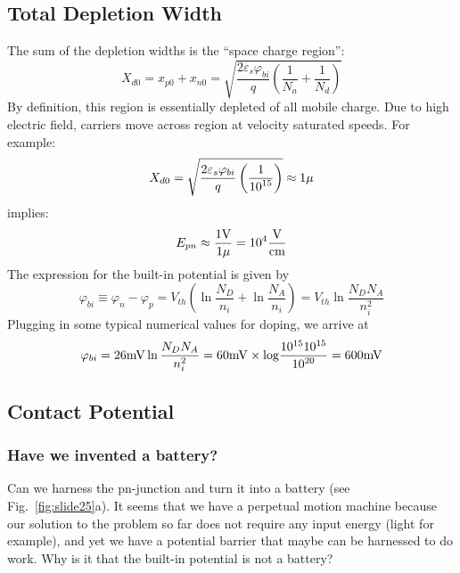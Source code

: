 \subsection{Total Depletion Width}
The sum of the depletion widths is the “space charge region”:
\begin{equation} 
	{X_{d0}} = {x_{p0}} + {x_{n0}} = \sqrt {\frac{{2{\varepsilon _s}{\varphi _{bi}}}}{q}\left( {\frac{1}{{{N_a}}} + \frac{1}{{{N_d}}}} \right)} 
\end{equation}
By definition, this region is essentially depleted of all mobile charge.   Due to high electric field, carriers move across region at velocity saturated speeds.  For example:
\begin{equation} 
	{X_{d0}} = \sqrt {\frac{{2{\varepsilon _s}{\varphi _{bi}}}}{q}\left( {\frac{1}{{{{10}^{15}}}}} \right)}  \approx 1{\rm{\mu }} 
\end{equation}
implies:
\begin{equation} 
	{E_{pn}} \approx \frac{{1{\rm{V}}}}{{1{\rm{\mu }}}} = {10^4}\frac{{\rm{V}}}{{{\rm{cm}}}} 
\end{equation}
The expression for the built-in potential is given by
\begin{equation} 
	{\varphi _{bi}} \equiv {\varphi _n} - {\varphi _p} = {V_{th}}\left( {\ln \frac{{{N_D}}}{{{n_i}}} + \ln \frac{{{N_A}}}{{{n_i}}}} \right) = {V_{th}}\ln \frac{{{N_D}{N_A}}}{{n_i^2}} 
\end{equation}
Plugging in some typical numerical values for doping, we arrive at
\begin{equation} 
	{\varphi _{bi}} = 26{\rm{mV}}\ln \frac{{{N_D}{N_A}}}{{n_i^2}} = 60{\rm{mV}} \times {\rm{log}}\frac{{{\rm{1}}{{\rm{0}}^{{\rm{15}}}}{{10}^{15}}}}{{{{10}^{20}}}} = 600{\rm{mV}} 
\end{equation}
\subsection{Contact Potential}
\subsubsection{Have we invented a battery?}
Can we harness the pn-junction and turn it into a battery (see Fig.~\ref{fig:slide25}a).  It seems that we have a perpetual motion machine because our solution to the problem so far does not require any input energy (light for example), and yet we have a potential barrier that maybe can be harnessed to do work.  Why is it that the built-in potential is not a battery?

